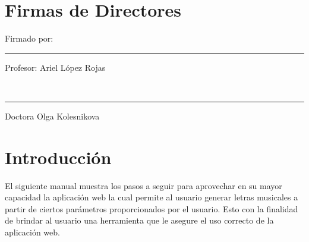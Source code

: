 \documentclass[12pt, a4paper, titlepage]{report}
\begin{document}
	\newpage
	\section*{Firmas de Directores}
	
	\vfill  %
	\noindent 
	\parbox[b]{0.4\linewidth}{%
		\strut 
		Firmado por: \\[3cm]%
		\hrule
		Profesor: Ariel López Rojas} 
	\hspace{1cm} %
	\parbox[b]{0.4\linewidth}{%
		\strut 
		\\[3cm]%
		\hrule
		Doctora Olga Kolesnikova} 
	\par\vspace{1cm} 
	\newpage
	\renewcommand\appendixpagename{Índice}
	\renewcommand\appendixtocname{Índice}
	\appendixpageoff
	\begin{appendices}
		\renewcommand*\contentsname{{\textcolor{azulescom}{Índice.}}}
		\tableofcontents
		\newpage
		\renewcommand*\listfigurename{{\textcolor{azulescom}{Índice de figuras.}}}
		\listoffigures
		\newpage
		\newpage
	\end{appendices}
	
	\section{Introducción}
	El siguiente manual muestra los pasos a seguir para aprovechar en su mayor capacidad la aplicación web la cual permite al usuario generar letras musicales a partir de ciertos parámetros proporcionados por el usuario. Esto con la finalidad de brindar al usuario una herramienta que le asegure el uso correcto de la aplicación web.
	
\end{document}
